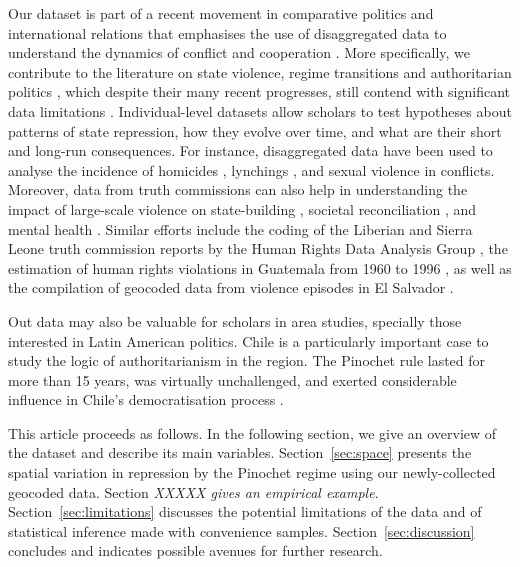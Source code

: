 \documentclass[a4paper,12pt]{article}
\begin{document}
Our dataset is part of a recent movement in comparative politics and international relations that emphasises the use of disaggregated data to understand the dynamics of conflict and cooperation \citep[e.g.,][]{cederman2009disaggregating, kalyvas2006logic, kalyvas2008microdynamics,lyall2010coethnics,raleigh2012violence}. More specifically, we contribute to the literature on state violence, regime transitions and authoritarian politics \citep[e.g.,][]{gandhi2008political,huneeus2014democracia,huneeus2016regimen,slater2010ordering}, which despite their many recent progresses, still contend with significant data limitations \citep[365]{art2012we}. Individual-level datasets allow scholars to test hypotheses about patterns of state repression, how they evolve over time, and what are their short and long-run consequences. For instance, disaggregated data have been used to analyse the incidence of homicides \citep{karstedt2012contextualizing}, lynchings \citep{godoy2002lynchings}, and sexual violence  \citep{sivakumaran2007sexual,wood2006variation,wood2009armed} in conflicts. Moreover, data from truth commissions can also help in understanding the impact of large-scale violence on state-building \citep{call2003democratisation}, societal reconciliation \citep{gibson2006contributions}, and mental health \citep{brouneus2010trauma, godoy2011something}. Similar efforts include the coding of the Liberian and Sierra Leone truth commission reports by the Human Rights Data Analysis Group \citep{hrgd2009liberia,hrgd2010sierra}, the estimation of human rights violations in Guatemala from 1960 to 1996 \citep{ball1999guatemala}, as well as the compilation of geocoded data from violence episodes in El Salvador \citep{mason2012elsalvador}. 

Out data may also be valuable for scholars in area studies, specially those interested in Latin American politics. Chile is a particularly important case to study the logic of authoritarianism in the region. The Pinochet rule lasted for more than 15 years, was virtually unchallenged, and exerted considerable influence in Chile's democratisation process \citep{angell2005elecciones,barros2002constitutionalism,policzer2009rise, portales2000chile}.

This article proceeds as follows. In the following section, we give an overview of the dataset and describe its main variables. Section~\ref{sec:space} presents the spatial variation in repression by the Pinochet regime using our newly-collected geocoded data. Section \textit{XXXXX gives an empirical example}. Section~\ref{sec:limitations} discusses the potential limitations of the data and of statistical inference made with convenience samples. Section~\ref{sec:discussion} concludes and indicates possible avenues for further research.
\end{document}
